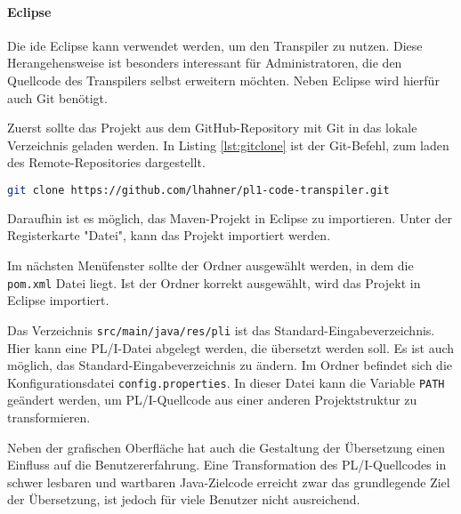 \paragraph{Eclipse}
Die \ac{ide} Eclipse kann verwendet werden, um den Transpiler zu nutzen. Diese Herangehensweise ist besonders interessant für Administratoren, die den Quellcode des Transpilers selbst erweitern möchten. Neben Eclipse wird hierfür auch Git benötigt. 

Zuerst sollte das Projekt aus dem GitHub-Repository mit Git in das lokale Verzeichnis geladen werden.
In Listing \ref{lst:gitclone} ist der Git-Befehl, zum laden des Remote-Repositories dargestellt. 

\begin{lstlisting}[language=bash, caption=Herunterladen der Repository des Transpilers, label={lst:gitclone}]
git clone https://github.com/lhahner/pl1-code-transpiler.git
\end{lstlisting}

Daraufhin ist es möglich, das Maven-Projekt in Eclipse zu importieren. Unter der Registerkarte "Datei", kann das Projekt importiert werden. %


Im nächsten Menüfenster sollte der Ordner ausgewählt werden, in dem die \verb+pom.xml+ Datei liegt. Ist der Ordner korrekt ausgewählt, wird das Projekt in Eclipse importiert. 

Das Verzeichnis \verb+src/main/java/res/pli+ ist das Standard-Eingabeverzeichnis. Hier kann eine PL/I-Datei abgelegt werden, die übersetzt werden soll. Es ist auch möglich, das Standard-Eingabeverzeichnis zu ändern. 
Im Ordner  befindet sich die Konfigurationsdatei 
\verb+config.properties+. In dieser Datei kann die Variable \verb+PATH+ geändert werden, 
um PL/I-Quellcode aus einer anderen Projektstruktur zu transformieren.


Neben der grafischen Oberfläche hat auch die Gestaltung der Übersetzung einen Einfluss auf die Benutzererfahrung. Eine Transformation des PL/I-Quellcodes in schwer lesbaren und wartbaren Java-Zielcode erreicht zwar das grundlegende Ziel der Übersetzung, ist jedoch für viele Benutzer nicht ausreichend.

